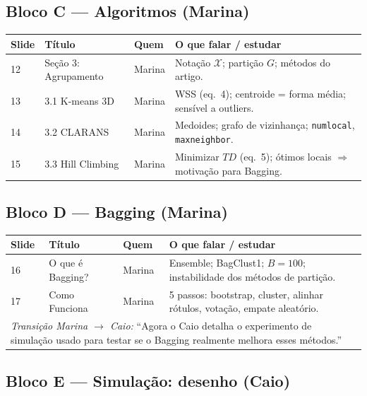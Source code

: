 \documentclass[12pt,a4paper]{article}
\begin{document}
\subsection{Bloco C --- Algoritmos (Marina)}

\begin{longtable}{@{}p{1.2cm}p{5.5cm}p{2.2cm}p{5.8cm}@{}}
\toprule
\textbf{Slide} & \textbf{Título} & \textbf{Quem} & \textbf{O que falar / estudar} \\
\midrule
\endhead
12 & Seção 3: Agrupamento & Marina & Notação $\mathcal{X}$; partição $G$; métodos do artigo. \\
13 & 3.1 K-means 3D & Marina & WSS (eq.\ 4); centroide = forma média; sensível a outliers. \\
14 & 3.2 CLARANS & Marina & Medoides; grafo de vizinhança; \texttt{numlocal}, \texttt{maxneighbor}. \\
15 & 3.3 Hill Climbing & Marina & Minimizar $TD$ (eq.\ 5); ótimos locais $\Rightarrow$ motivação para Bagging. \\
\bottomrule
\end{longtable}

\subsection{Bloco D --- Bagging (Marina)}

\begin{longtable}{@{}p{1.2cm}p{5.5cm}p{2.2cm}p{5.8cm}@{}}
\toprule
\textbf{Slide} & \textbf{Título} & \textbf{Quem} & \textbf{O que falar / estudar} \\
\midrule
\endhead
16 & O que é Bagging? & Marina & Ensemble; BagClust1; $B=100$; instabilidade dos métodos de partição. \\
17 & Como Funciona & Marina & 5 passos: bootstrap, cluster, alinhar rótulos, votação, empate aleatório. \\
\midrule
\multicolumn{4}{l}{\textit{Transição Marina $\rightarrow$ Caio:} ``Agora o Caio detalha o experimento de simulação usado para testar se o Bagging realmente melhora esses métodos.''} \\
\bottomrule
\end{longtable}

\subsection{Bloco E --- Simulação: desenho (Caio)}
\end{document}
